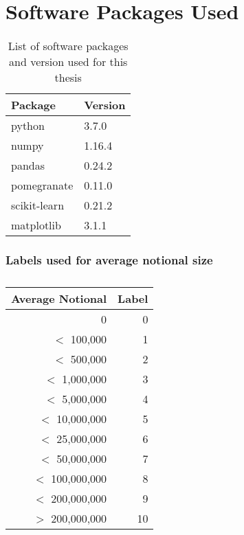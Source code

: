 \chapter{Software Packages Used}\label{AppC}

\begin{table}[!ht]\centering
    \caption{List of software packages and version used for this thesis}\label{ChCTab1}
    \begin{tabular}{ll}
    \toprule
    \bfseries Package   & \bfseries Version \\
    \midrule
        python          & 3.7.0  \\
        numpy           & 1.16.4 \\
        pandas          & 0.24.2 \\
        pomegranate     & 0.11.0 \\
        scikit-learn    & 0.21.2 \\
        matplotlib      & 3.1.1  \\
    \bottomrule
    \end{tabular}
\end{table}


\subsection{Labels used for average notional size}

\begin{table}[!ht]\centering
    \caption{}\label{AppTab:1}
    \begin{tabular}{rr}
        \toprule
            Average Notional  & Label \\
        \midrule
                            0 &  0   \\
            $<$       100,000 &  1   \\
            $<$       500,000 &  2   \\
            $<$     1,000,000 &  3   \\
            $<$     5,000,000 &  4   \\
            $<$    10,000,000 &  5   \\
            $<$    25,000,000 &  6   \\
            $<$    50,000,000 &  7   \\
            $<$   100,000,000 &  8   \\
            $<$   200,000,000 &  9   \\
            $>$   200,000,000 & 10   \\
        \bottomrule
    \end{tabular}
\end{table}
